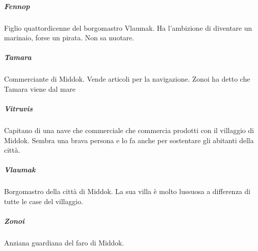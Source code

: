\documentclass[letterpaper,twocolumn,openany, nodeprecatedcode, nomultitoc]{dndbook}
\begin{document}
\subparagraph{Fennop} Figlio quattordicenne del borgomastro Vlaumak. Ha l'ambizione di diventare un marinaio, forse un pirata. Non sa nuotare.

\subparagraph{Tamara} Commerciante di Middok. Vende articoli per la navigazione. Zonoi ha detto che Tamara viene dal mare

\subparagraph{Vitruvis} Capitano di una nave che commerciale che commercia prodotti con il villaggio di Middok. Sembra una brava persona e lo fa anche per sostentare gli abitanti della città.

\subparagraph{Vlaumak} Borgomastro della città di Middok. La sua villa è molto lussuosa a differenza di tutte le case del villaggio.

\subparagraph{Zonoi} Anziana guardiana del faro di Middok.
\end{document}
